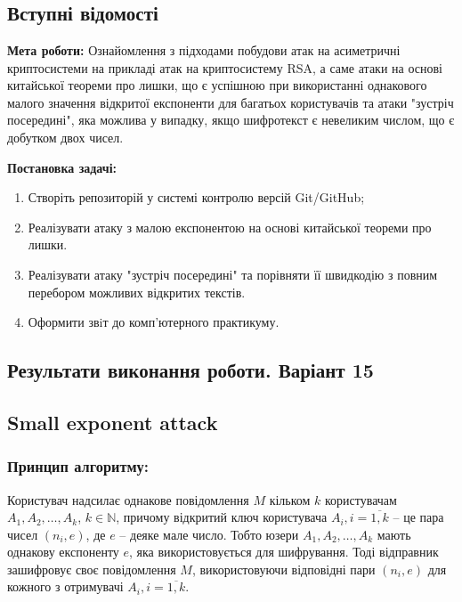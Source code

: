 \chapter{}
\section{Вступні відомості}
\noindent\textbf{Мета роботи:} Ознайомлення з підходами побудови атак на асиметричні криптосистеми на прикладі атак на криптосистему 
RSA, а саме атаки на основі китайської теореми про лишки, що є успішною при використанні однакового малого значення відкритої експоненти 
для багатьох користувачів та атаки "зустріч посередині"{}, яка можлива у випадку, якщо шифротекст є невеликим числом, що є добутком двох чисел.

\noindent\textbf{Постановка задачі:}
\begin{enumerate}
    \item Створіть репозиторій у системі контролю версій Git/GitHub;
    \item Реалізувати атаку з малою експонентою на основі китайської теореми про лишки.
    \item Реалізувати атаку "зустріч посередині"{} та порівняти її швидкодію з повним перебором можливих відкритих текстів.
    \item Оформити звiт до комп’ютерного практикуму.
\end{enumerate}
\section*{Результати виконання роботи. Варіант 15}

\section{Small exponent attack}
\subsection{Принцип алгоритму:}
Користувач надсилає однакове повідомлення $M$ кільком $k$ користувачам $A_{1}, A_{2}, \dots, A_{k}$, $k \in \mathbb{N}$, 
причому відкритий ключ користувача $A_{i}, i = \overline{1, k}$ -- це пара чисел $(n_{i}, e)$, де $e$ -- деяке мале число. 
Тобто юзери $A_{1}, A_{2}, \dots, A_{k}$ мають однакову експоненту $e$, яка використовується для шифрування. Тоді 
відправник зашифровує своє повідомлення $M$, використовуючи відповідні пари $(n_{i}, e)$ для кожного з отримувачі $A_{i}, i = \overline{1, k}$. 

